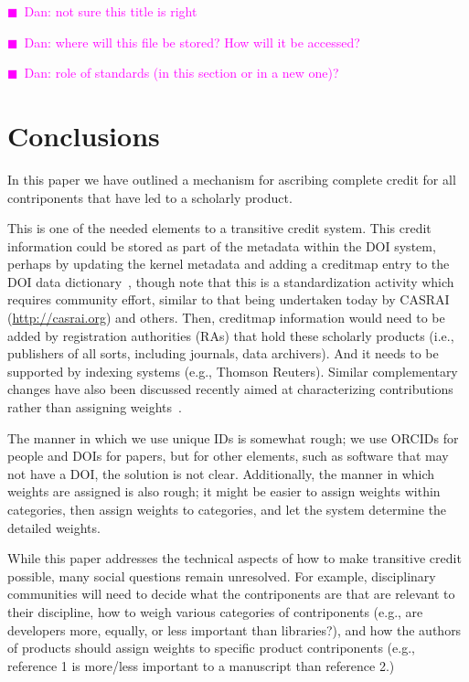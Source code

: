 \documentclass[a4paper,10pt]{article}
\newcommand{\katznote}[1]{ {\textcolor{magenta}    {$\blacksquare$~Dan:      #1 }}}
\begin{document}
\katznote{not sure this title is right}

\katznote{where will this file be stored?  How will it be accessed?}

\katznote{role of standards (in this section or in a new one)?}

\section{Conclusions}

In this paper we have outlined a mechanism for ascribing complete credit for all contriponents that have led to a scholarly product.

This is one of the needed elements to a transitive credit system.  This credit information could be stored as part of the metadata within the DOI system, perhaps by updating the kernel metadata and adding a creditmap entry to the DOI data dictionary~\cite{DOI-data-model}, though note that this is a standardization activity which requires community effort, similar to that being undertaken today by CASRAI (\url{http://casrai.org}) and others. Then, creditmap information would need to be added by registration authorities (RAs) that hold these scholarly products (i.e., publishers of all sorts, including journals, data archivers).  And it needs to be supported by indexing systems (e.g., Thomson Reuters). Similar complementary changes have also been discussed recently aimed at characterizing contributions rather than assigning  weights~\cite{metatags,contributorship-taxonomy,teams}.

The manner in which we use unique IDs is somewhat rough; we use ORCIDs for people and DOIs for papers, but for other elements, such as software that may not have a DOI, the solution is not clear.
Additionally, the manner in which weights are assigned is also rough; it might be easier to assign weights within categories, then assign weights to categories, and let the system determine the detailed weights.

While this paper addresses the technical aspects of how to make transitive credit possible, many social questions remain unresolved. For example, disciplinary communities will need to decide what the contriponents are that are relevant to their discipline, how to weigh various categories of contriponents (e.g., are developers more, equally, or less important than libraries?), and how the authors of products should assign weights to specific product contriponents (e.g., reference 1 is more/less important to a manuscript than reference 2.) 
\end{document}
